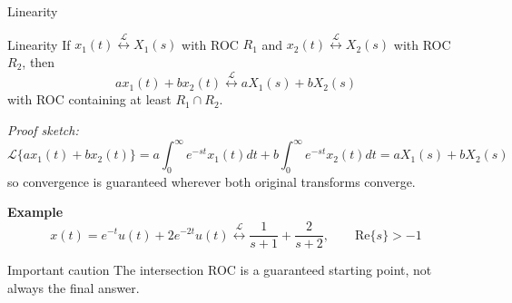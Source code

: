 \begin{frame}[t]{Linearity}
  \small
  \begin{conceptbox}{Linearity}
    If $x_1(t) \stackrel{\mathcal{L}}{\longleftrightarrow} X_1(s)$ with ROC $R_1$ and
    $x_2(t) \stackrel{\mathcal{L}}{\longleftrightarrow} X_2(s)$ with ROC $R_2$, then
    \[
      a x_1(t) + b x_2(t) \stackrel{\mathcal{L}}{\longleftrightarrow} a X_1(s) + b X_2(s)
    \]
    with ROC containing at least $R_1 \cap R_2$.
  \end{conceptbox}

  \vspace{0.06cm}
  \textit{Proof sketch:}
  \[
    \mathcal{L}\{a x_1(t)+b x_2(t)\}=a\int_{0}^{\infty} e^{-st} x_1(t) dt + b\int_{0}^{\infty} e^{-st} x_2(t) dt =aX_1(s)+bX_2(s)
  \]
  so convergence is guaranteed wherever both original transforms converge.

  \vspace{0.08cm}
  \textbf{Example}
  \[
    x(t)=e^{-t}u(t)+2e^{-2t}u(t)
    \stackrel{\mathcal{L}}{\longleftrightarrow}
    \frac{1}{s+1}+\frac{2}{s+2},
    \qquad \text{Re}\{s\}>-1
  \]

  \vspace{0.08cm}
  \begin{insightbox}{Important caution}
    The intersection ROC is a guaranteed starting point, not always the final answer.
  \end{insightbox}
\end{frame}

